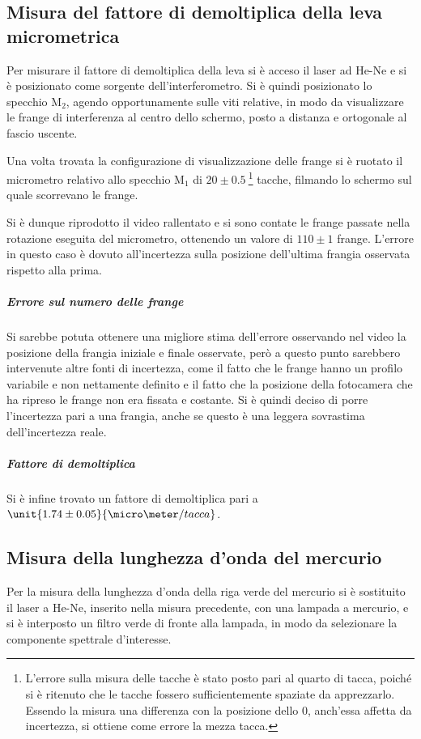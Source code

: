 \documentclass[a4paper,10pt]{article}
\begin{document}
{{{{\subsection{Misura del fattore di demoltiplica della leva micrometrica}
Per misurare il fattore di demoltiplica della leva si è acceso il laser ad He-Ne e si è posizionato come sorgente dell'interferometro.
Si è quindi posizionato lo specchio M$_2$, agendo opportunamente sulle viti relative, in modo da visualizzare le frange di interferenza al centro dello schermo, posto a distanza e ortogonale al fascio uscente.

Una volta trovata la configurazione di visualizzazione delle frange si è ruotato il micrometro relativo allo specchio M$_1$ di $20 \pm 0.5~$\footnote{L'errore sulla misura delle tacche è stato posto pari al quarto di tacca, poiché si è ritenuto che le tacche fossero sufficientemente spaziate da apprezzarlo. Essendo la misura una differenza con la posizione dello 0, anch'essa affetta da incertezza, si ottiene come errore la mezza tacca.} tacche, filmando lo schermo sul quale scorrevano le frange.

Si è dunque riprodotto il video rallentato e si sono contate le frange passate nella rotazione eseguita del micrometro, ottenendo un valore di $110 \pm 1$ frange. L'errore in questo caso è dovuto all'incertezza sulla posizione dell'ultima frangia osservata rispetto alla prima.

\subparagraph{Errore sul numero delle frange} Si sarebbe potuta ottenere una migliore stima dell'errore osservando nel video la posizione della frangia iniziale e finale osservate, però a questo punto sarebbero intervenute altre fonti di incertezza, come il fatto che le frange hanno un profilo variabile e non nettamente definito e il fatto che la posizione della fotocamera che ha ripreso le frange non era fissata e costante. Si è quindi deciso di porre l'incertezza pari a una frangia, anche se questo è una leggera sovrastima dell'incertezza reale.

\subparagraph{Fattore di demoltiplica} Si è infine trovato un fattore di demoltiplica pari a $\unit{1.74 \pm 0.05}{\micro\meter / tacca}$.

\subsection{Misura della lunghezza d'onda del mercurio}
Per la misura della lunghezza d'onda della riga verde del mercurio si è sostituito il laser a He-Ne, inserito nella misura precedente, con una lampada a mercurio, e si è interposto un filtro verde di fronte alla lampada, in modo da selezionare la componente spettrale d'interesse.

}}}}
\end{document}
